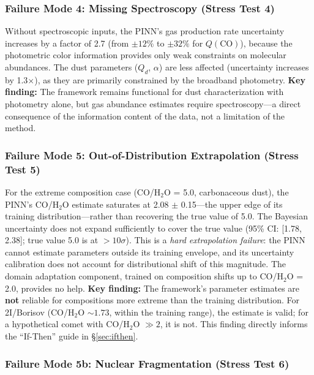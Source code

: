 \documentclass[preprint2]{aastex631}
\begin{document}
\subsubsection{Failure Mode 4: Missing Spectroscopy (Stress Test 4)}

Without spectroscopic inputs, the PINN's gas production rate uncertainty increases by a factor of 2.7 (from $\pm 12\%$ to $\pm 32\%$ for $Q(\text{CO})$), because the photometric color information provides only weak constraints on molecular abundances. The dust parameters ($Q_d$, $\alpha$) are less affected (uncertainty increases by 1.3$\times$), as they are primarily constrained by the broadband photometry. \textbf{Key finding:} The framework remains functional for dust characterization with photometry alone, but gas abundance estimates require spectroscopy---a direct consequence of the information content of the data, not a limitation of the method.

\subsubsection{Failure Mode 5: Out-of-Distribution Extrapolation (Stress Test 5)}

For the extreme composition case (CO/H$_2$O = 5.0, carbonaceous dust), the PINN's CO/H$_2$O estimate saturates at 2.08 $\pm$ 0.15---the upper edge of its training distribution---rather than recovering the true value of 5.0. The Bayesian uncertainty does not expand sufficiently to cover the true value (95\% CI: [1.78, 2.38]; true value 5.0 is at $>10\sigma$). This is a \textit{hard extrapolation failure}: the PINN cannot estimate parameters outside its training envelope, and its uncertainty calibration does not account for distributional shift of this magnitude. The domain adaptation component, trained on composition shifts up to CO/H$_2$O = 2.0, provides no help. \textbf{Key finding:} The framework's parameter estimates are \textbf{not} reliable for compositions more extreme than the training distribution. For 2I/Borisov (CO/H$_2$O $\sim 1.73$, within the training range), the estimate is valid; for a hypothetical comet with CO/H$_2$O $\gg 2$, it is not. This finding directly informs the ``If-Then'' guide in \S\ref{sec:ifthen}.

\subsubsection{Failure Mode 5b: Nuclear Fragmentation (Stress Test 6)}
\end{document}
